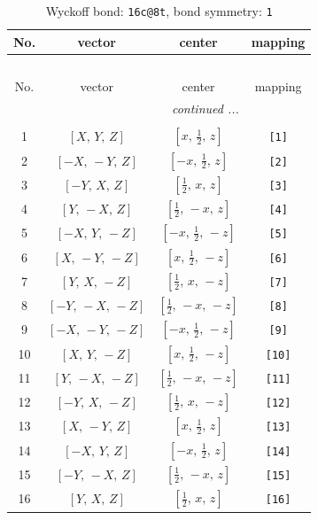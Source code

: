 \documentclass[fleqn,8pt]{jsarticle}
\begin{document}
\begin{longtable}{cccc}
\caption{Wyckoff bond: {\tt 16c@8t}, bond symmetry: {\tt 1}}
 \\
 \hline \hline
No. & vector & center & mapping \\ \hline \endfirsthead

\multicolumn{3}{l}{\tablename\ \thetable{}} \\
 \hline \hline
No. & vector & center & mapping \\ \hline \endhead

 \hline \hline
\multicolumn{3}{r}{\footnotesize\it continued ...} \\ \endfoot

 \hline \hline
\multicolumn{3}{r}{} \\ \endlastfoot

1 & $\left[ X,\, Y,\, Z \right]$ & $\left[ x,\, \frac{1}{2},\, z \right]$ & {\tt [1]} \\ \hline
2 & $\left[ - X,\, - Y,\, Z \right]$ & $\left[ - x,\, \frac{1}{2},\, z \right]$ & {\tt [2]} \\ \hline
3 & $\left[ - Y,\, X,\, Z \right]$ & $\left[ \frac{1}{2},\, x,\, z \right]$ & {\tt [3]} \\ \hline
4 & $\left[ Y,\, - X,\, Z \right]$ & $\left[ \frac{1}{2},\, - x,\, z \right]$ & {\tt [4]} \\ \hline
5 & $\left[ - X,\, Y,\, - Z \right]$ & $\left[ - x,\, \frac{1}{2},\, - z \right]$ & {\tt [5]} \\ \hline
6 & $\left[ X,\, - Y,\, - Z \right]$ & $\left[ x,\, \frac{1}{2},\, - z \right]$ & {\tt [6]} \\ \hline
7 & $\left[ Y,\, X,\, - Z \right]$ & $\left[ \frac{1}{2},\, x,\, - z \right]$ & {\tt [7]} \\ \hline
8 & $\left[ - Y,\, - X,\, - Z \right]$ & $\left[ \frac{1}{2},\, - x,\, - z \right]$ & {\tt [8]} \\ \hline
9 & $\left[ - X,\, - Y,\, - Z \right]$ & $\left[ - x,\, \frac{1}{2},\, - z \right]$ & {\tt [9]} \\ \hline
10 & $\left[ X,\, Y,\, - Z \right]$ & $\left[ x,\, \frac{1}{2},\, - z \right]$ & {\tt [10]} \\ \hline
11 & $\left[ Y,\, - X,\, - Z \right]$ & $\left[ \frac{1}{2},\, - x,\, - z \right]$ & {\tt [11]} \\ \hline
12 & $\left[ - Y,\, X,\, - Z \right]$ & $\left[ \frac{1}{2},\, x,\, - z \right]$ & {\tt [12]} \\ \hline
13 & $\left[ X,\, - Y,\, Z \right]$ & $\left[ x,\, \frac{1}{2},\, z \right]$ & {\tt [13]} \\ \hline
14 & $\left[ - X,\, Y,\, Z \right]$ & $\left[ - x,\, \frac{1}{2},\, z \right]$ & {\tt [14]} \\ \hline
15 & $\left[ - Y,\, - X,\, Z \right]$ & $\left[ \frac{1}{2},\, - x,\, z \right]$ & {\tt [15]} \\ \hline
16 & $\left[ Y,\, X,\, Z \right]$ & $\left[ \frac{1}{2},\, x,\, z \right]$ & {\tt [16]} \\
\end{longtable}
\end{document}
